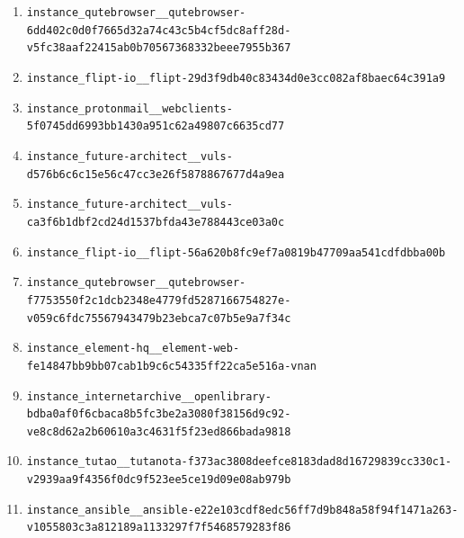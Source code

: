 \begin{enumerate}
\item \texttt{instance\_\allowbreak{}qutebrowser\_\allowbreak{}\_\allowbreak{}qutebrowser-\allowbreak{}6dd402c0d0f766\allowbreak{}5d32a74c43c5b4\allowbreak{}cf5dc8aff28d-\allowbreak{}v5fc38aaf22415\allowbreak{}ab0b7056736833\allowbreak{}2beee7955b367}
\item \texttt{instance\_\allowbreak{}flipt-\allowbreak{}io\_\allowbreak{}\_\allowbreak{}flipt-\allowbreak{}29d3f9db40c834\allowbreak{}34d0e3cc082af8\allowbreak{}baec64c391a9}
\item \texttt{instance\_\allowbreak{}protonmail\_\allowbreak{}\_\allowbreak{}webclients-\allowbreak{}5f0745dd6993bb\allowbreak{}1430a951c62a49\allowbreak{}807c6635cd77}
\item \texttt{instance\_\allowbreak{}future-\allowbreak{}architect\_\allowbreak{}\_\allowbreak{}vuls-\allowbreak{}d576b6c6c15e56\allowbreak{}c47cc3e26f5878\allowbreak{}867677d4a9ea}
\item \texttt{instance\_\allowbreak{}future-\allowbreak{}architect\_\allowbreak{}\_\allowbreak{}vuls-\allowbreak{}ca3f6b1dbf2cd2\allowbreak{}4d1537bfda43e7\allowbreak{}88443ce03a0c}
\item \texttt{instance\_\allowbreak{}flipt-\allowbreak{}io\_\allowbreak{}\_\allowbreak{}flipt-\allowbreak{}56a620b8fc9ef7\allowbreak{}a0819b47709aa5\allowbreak{}41cdfdbba00b}
\item \texttt{instance\_\allowbreak{}qutebrowser\_\allowbreak{}\_\allowbreak{}qutebrowser-\allowbreak{}f7753550f2c1dc\allowbreak{}b2348e4779fd52\allowbreak{}87166754827e-\allowbreak{}v059c6fdc75567\allowbreak{}943479b23ebca7\allowbreak{}c07b5e9a7f34c}
\item \texttt{instance\_\allowbreak{}element-\allowbreak{}hq\_\allowbreak{}\_\allowbreak{}element-\allowbreak{}web-\allowbreak{}fe14847bb9bb07\allowbreak{}cab1b9c6c54335\allowbreak{}ff22ca5e516a-\allowbreak{}vnan}
\item \texttt{instance\_\allowbreak{}internetarchiv\allowbreak{}e\_\allowbreak{}\_\allowbreak{}openlibrary-\allowbreak{}bdba0af0f6cbac\allowbreak{}a8b5fc3be2a308\allowbreak{}0f38156d9c92-\allowbreak{}ve8c8d62a2b606\allowbreak{}10a3c4631f5f23\allowbreak{}ed866bada9818}
\item \texttt{instance\_\allowbreak{}tutao\_\allowbreak{}\_\allowbreak{}tutanota-\allowbreak{}f373ac3808deef\allowbreak{}ce8183dad8d167\allowbreak{}29839cc330c1-\allowbreak{}v2939aa9f4356f\allowbreak{}0dc9f523ee5ce1\allowbreak{}9d09e08ab979b}
\item \texttt{instance\_\allowbreak{}ansible\_\allowbreak{}\_\allowbreak{}ansible-\allowbreak{}e22e103cdf8edc\allowbreak{}56ff7d9b848a58\allowbreak{}f94f1471a263-\allowbreak{}v1055803c3a812\allowbreak{}189a1133297f7f\allowbreak{}5468579283f86}

\end{enumerate}
